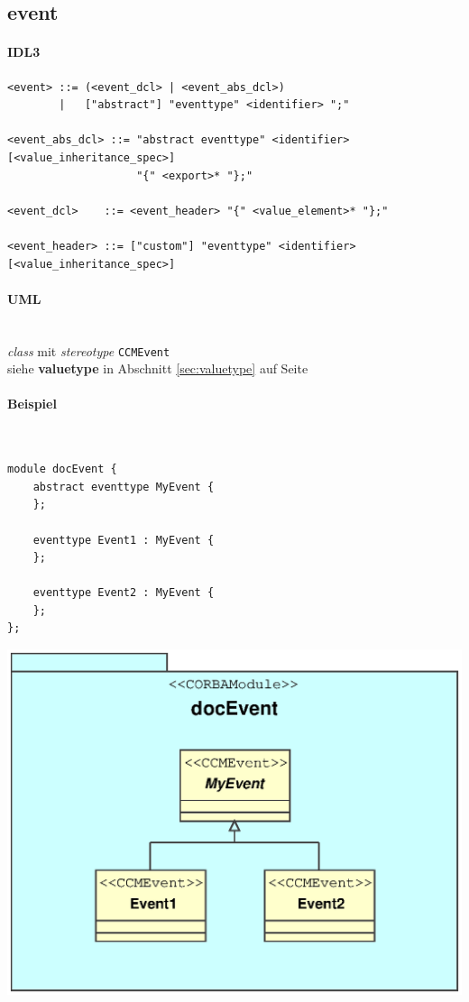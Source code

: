\documentclass [a4paper,10pt] {scrartcl}
\begin{document}
\cleardoublepage
\subsection{event}
\paragraph{IDL3}
\begin{verbatim}
<event> ::= (<event_dcl> | <event_abs_dcl>)
        |   ["abstract"] "eventtype" <identifier> ";"

<event_abs_dcl> ::= "abstract eventtype" <identifier> [<value_inheritance_spec>]
                    "{" <export>* "};"

<event_dcl>    ::= <event_header> "{" <value_element>* "};"

<event_header> ::= ["custom"] "eventtype" <identifier> [<value_inheritance_spec>]
\end{verbatim}
\paragraph{UML}~\\
\emph{class} mit \emph{stereotype} \texttt{CCMEvent}\\
siehe \textbf{valuetype} in Abschnitt \ref{sec:valuetype} auf Seite \pageref{sec:valuetype}\\
\paragraph{Beispiel}
~\\
\begin{minipage}{0.6 \linewidth}
\begin{verbatim}
module docEvent {
    abstract eventtype MyEvent {
    };

    eventtype Event1 : MyEvent {
    };

    eventtype Event2 : MyEvent {
    };
};
\end{verbatim}
\end{minipage}
\hfill
\begin{minipage}{0.4 \linewidth}
\includegraphics[width=1.4 \linewidth]{docEvent.eps}
\end{minipage}
\end{document}
